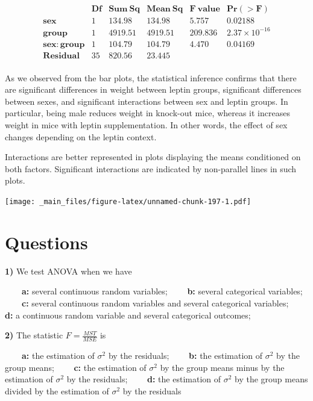 \documentclass[
]{book}
\begin{document}
\[ \begin{array}{lccccc} &\mathbf{Df} & \mathbf{Sum\ Sq} & \mathbf{Mean\ Sq} & \mathbf{F\ value} & \mathbf{Pr(>F)} \\ \mathbf{sex} & 1 & 134.98 & 134.98 & 5.757 & 0.02188 \\ \mathbf{group} & 1 & 4919.51 & 4919.51 & 209.836 & 2.37 \times 10^{-16} \\ \mathbf{sex:group} & 1 & 104.79 & 104.79 & 4.470 & 0.04169 \\ \mathbf{Residual} & 35 & 820.56 & 23.445 & & \\ \end{array} \]

As we observed from the bar plots, the statistical inference confirms that there are significant differences in weight between leptin groups, significant differences between sexes, and significant interactions between sex and leptin groups. In particular, being male reduces weight in knock-out mice, whereas it increases weight in mice with leptin supplementation. In other words, the effect of sex changes depending on the leptin context.

Interactions are better represented in plots displaying the means conditioned on both factors. Significant interactions are indicated by non-parallel lines in such plots.

\texttt{[image: \_main\_files/figure-latex/unnamed-chunk-197-1.pdf]}

\hypertarget{questions-13}{%
\section{Questions}\label{questions-13}}

\textbf{1)} We test ANOVA when we have

\textbf{\(\qquad\)a:} several continuous random variables;
\textbf{\(\qquad\)b:} several categorical variables;
\textbf{\(\qquad\)c:} several continuous random variables and several categorical variables;
\textbf{\(\qquad\)d:} a continuous random variable and several categorical outcomes;

\textbf{2)} The statistic \(F=\frac{MST}{MSE}\) is

\textbf{\(\qquad\)a:} the estimation of \(\sigma^2\) by the residuals;
\textbf{\(\qquad\)b:} the estimation of \(\sigma^2\) by the group means;
\textbf{\(\qquad\)c:} the estimation of \(\sigma^2\) by the group means minus by the estimation of \(\sigma^2\) by the residuals;
\textbf{\(\qquad\)d:} the estimation of \(\sigma^2\) by the group means divided by the estimation of \(\sigma^2\) by the residuals
\end{document}
